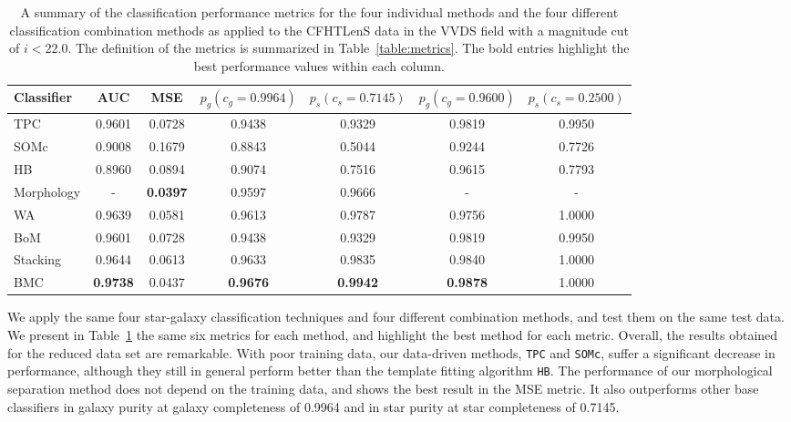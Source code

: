 \documentclass[useAMS,usenatbib]{mn2e}
\begin{document}
\begin{table}
  \caption{A summary of the classification performance metrics
           for the four individual methods
           and the four different classification combination methods
           as applied to the CFHTLenS data in the VVDS field
           with a magnitude cut of $i < 22.0$.
           The definition of the metrics is summarized in
           Table~\ref{table:metrics}.
           The bold entries highlight the best performance values
           within each column.}
  \centering
  \begin{tabular}{l c c c c c c}
    Classifier & AUC & MSE &
    $p_{g}\left(c_g=0.9964\right)$ & $p_{s}\left(c_s=0.7145\right)$ &
    $p_{g}\left(c_g=0.9600\right)$ & $p_{s}\left(c_s=0.2500\right)$\\
    \hline
    TPC  & 0.9601 & 0.0728 & 0.9438 & 0.9329 & 0.9819 & 0.9950\\
    SOMc & 0.9008 & 0.1679 & 0.8843 & 0.5044 & 0.9244 & 0.7726\\
    HB   & 0.8960 & 0.0894 & 0.9074 & 0.7516 & 0.9615 & 0.7793\\
    Morphology   & -      & \textbf{0.0397} & 0.9597 & 0.9666 & - & -\\
    WA   & 0.9639 & 0.0581 & 0.9613 & 0.9787 & 0.9756 & 1.0000\\
    BoM  & 0.9601 & 0.0728 & 0.9438 & 0.9329 & 0.9819 & 0.9950\\
    Stacking  & 0.9644 & 0.0613 & 0.9633 & 0.9835 & 0.9840 & 1.0000\\
    BMC  & \textbf{0.9738} & 0.0437 & \textbf{0.9676} & \textbf{0.9942} &
    \textbf{0.9878} & 1.0000\\
  \end{tabular}
  \label{table:metrics_vvds}
\end{table}

We apply the same four star-galaxy classification techniques
and four different combination methods,
and test them on the same test data.
We present in Table~\ref{table:metrics_vvds}
the same six metrics for each method,
and highlight the best method for each metric.
Overall, the results obtained for the reduced data set are remarkable.
With poor training data, our data-driven methods,
\texttt{TPC} and \texttt{SOMc},
suffer a significant decrease in performance,
although they still in general perform better than 
the template fitting algorithm
\texttt{HB}.
The performance of our morphological separation method
does not depend on the training data,
and shows the best result in the MSE metric.
It also outperforms other base classifiers
in galaxy purity at galaxy completeness of 0.9964
and in star purity at star completeness of 0.7145.
\end{document}

